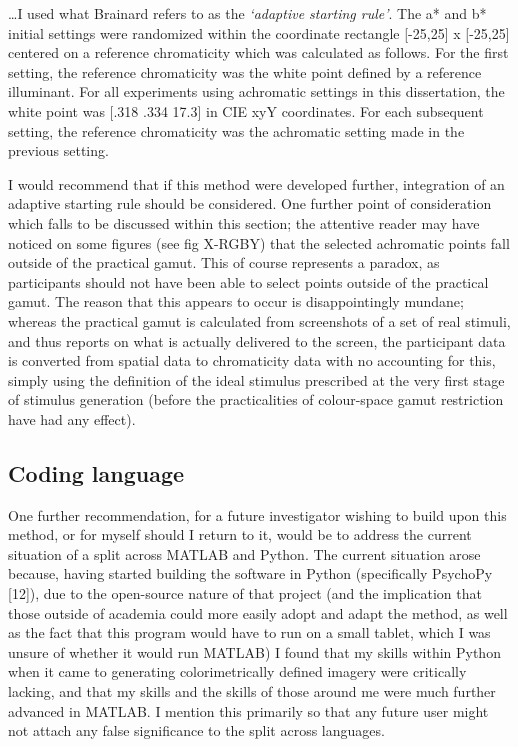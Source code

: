 \begin{displayquote}
\dots I used what Brainard refers to as the \emph{`adaptive starting rule'}. The a* and b* initial settings were randomized within the coordinate rectangle [-25,25] x [-25,25] centered on a reference chromaticity which was calculated as follows. For the first setting, the reference chromaticity was the white point defined by a reference illuminant. For all experiments using achromatic settings in this dissertation, the white point was [.318 .334 17.3] in CIE xyY coordinates. For each subsequent setting, the reference chromaticity was the achromatic setting made in the previous setting.
\end{displayquote}

I would recommend that if this method were developed further, integration of an adaptive starting rule should be considered.
One further point of consideration which falls to be discussed within this section; the attentive reader may have noticed on some figures (see fig X-RGBY) that the selected achromatic points fall outside of the practical gamut. This of course represents a paradox, as participants should not have been able to select points outside of the practical gamut. The reason that this appears to occur is disappointingly mundane; whereas the practical gamut is calculated from screenshots of a set of real stimuli, and thus reports on what is actually delivered to the screen, the participant data is converted from spatial data to chromaticity data with no accounting for this, simply using the definition of the ideal stimulus prescribed at the very first stage of stimulus generation (before the practicalities of colour-space gamut restriction have had any effect).

\subsection{Coding language}

One further recommendation, for a future investigator wishing to build upon this method, or for myself should I return to it, would be to address the current situation of a split across MATLAB and Python. The current situation arose because, having started building the software in Python (specifically PsychoPy [12]), due to the open-source nature of that project (and the implication that those outside of academia could more easily adopt and adapt the method, as well as the fact that this program would have to run on a small tablet, which I was unsure of whether it would run MATLAB) I found that my skills within Python when it came to generating colorimetrically defined imagery were critically lacking, and that my skills and the skills of those around me were much further advanced in MATLAB. I mention this primarily so that any future user might not attach any false significance to the split across languages.

